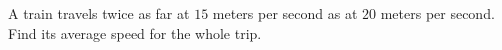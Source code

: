 A train travels twice as far at $15$ meters per second as at $20$ meters per second. Find its average speed for the whole trip.
